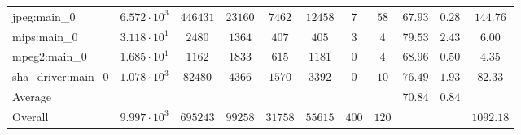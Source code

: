 \begin{tabular}{|l|c|c|c|c|c|c|c|c|c|c|}
jpeg:main\_0            & $ 6.572 \cdot 10^{3} $ & $ 446431 $ & $ 23160 $ & $ 7462  $ & $ 12458 $ & $ 7   $ & $ 58  $ & $ 67.93       $ & $ 0.28    $ & $ 144.76  $ \\
mips:main\_0            & $ 3.118 \cdot 10^{1} $ & $ 2480   $ & $ 1364  $ & $ 407   $ & $ 405   $ & $ 3   $ & $ 4   $ & $ 79.53       $ & $ 2.43    $ & $ 6.00    $ \\
mpeg2:main\_0           & $ 1.685 \cdot 10^{1} $ & $ 1162   $ & $ 1833  $ & $ 615   $ & $ 1181  $ & $ 0   $ & $ 4   $ & $ 68.96       $ & $ 0.50    $ & $ 4.35    $ \\
sha\_driver:main\_0     & $ 1.078 \cdot 10^{3} $ & $ 82480  $ & $ 4366  $ & $ 1570  $ & $ 3392  $ & $ 0   $ & $ 10  $ & $ 76.49       $ & $ 1.93    $ & $ 82.33   $ \\
\hline
Average                 & $                    $ & $        $ & $       $ & $       $ & $       $ & $     $ & $     $ & $ 70.84       $ & $ 0.84    $ & $         $ \\
\hline
Overall                 & $ 9.997 \cdot 10^{3} $ & $ 695243 $ & $ 99258 $ & $ 31758 $ & $ 55615 $ & $ 400 $ & $ 120 $ & $             $ & $         $ & $ 1092.18 $ \\
\hline
\end{tabular}
